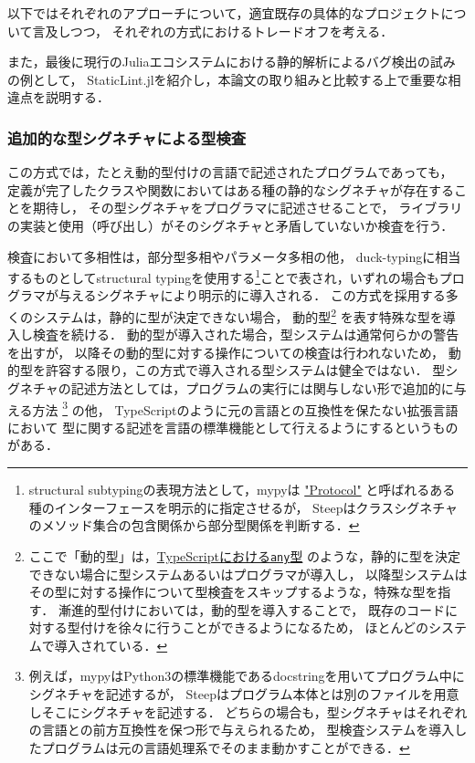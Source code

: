 以下ではそれぞれのアプローチについて，適宜既存の具体的なプロジェクトについて言及しつつ，
それぞれの方式におけるトレードオフを考える．

また，最後に現行のJuliaエコシステムにおける静的解析によるバグ検出の試みの例として，
StaticLint.jlを紹介し，本論文の取り組みと比較する上で重要な相違点を説明する．

\subsubsection{追加的な型シグネチャによる型検査} \label{prev-research:type-check-with-annotation}


この方式では，たとえ動的型付けの言語で記述されたプログラムであっても，
定義が完了したクラスや関数においてはある種の静的なシグネチャが存在することを期待し，
その型シグネチャをプログラマに記述させることで，
ライブラリの実装と使用（呼び出し）がそのシグネチャと矛盾していないか検査を行う\cite{ruby-progress-report}．

検査において多相性は，部分型多相やパラメータ多相の他，
duck-typingに相当するものとしてstructural typingを使用する\footnote{
  structural subtypingの表現方法として，mypyは
  \href{https://mypy.readthedocs.io/en/latest/protocols.html\#protocols-and-structural-subtyping}{"Protocol"}
  と呼ばれるある種のインターフェースを明示的に指定させるが，
  Steepはクラスシグネチャのメソッド集合の包含関係から部分型関係を判断する．%
}ことで表され，いずれの場合もプログラマが与えるシグネチャにより明示的に導入される．
この方式を採用する多くのシステムは，静的に型が決定できない場合，
動的型\footnote{
  ここで「動的型」は，\href{https://www.typescriptlang.org/docs/handbook/basic-types.html\#any}{TypeScriptにおける\texttt{any}型}
  のような，静的に型を決定できない場合に型システムあるいはプログラマが導入し，
  以降型システムはその型に対する操作について型検査をスキップするような，特殊な型を指す．
  漸進的型付けにおいては，動的型を導入することで，
  既存のコードに対する型付けを徐々に行うことができるようになるため，
  ほとんどのシステムで導入されている．
} を表す特殊な型を導入し検査を続ける．
動的型が導入された場合，型システムは通常何らかの警告を出すが，
以降その動的型に対する操作についての検査は行われないため，
動的型を許容する限り，この方式で導入される型システムは健全ではない．
型シグネチャの記述方法としては，プログラムの実行には関与しない形で追加的に与える方法
\footnote{
  例えば，mypyはPython3の標準機能であるdocstringを用いてプログラム中にシグネチャを記述するが，
  Steepはプログラム本体とは別のファイルを用意しそこにシグネチャを記述する．
  どちらの場合も，型シグネチャはそれぞれの言語との前方互換性を保つ形で与えられるため，
  型検査システムを導入したプログラムは元の言語処理系でそのまま動かすことができる．
} の他，
TypeScriptのように元の言語との互換性を保たない拡張言語において
型に関する記述を言語の標準機能として行えるようにするというものがある．

